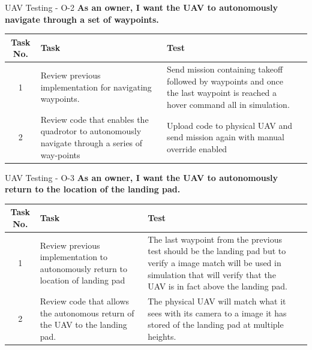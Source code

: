 \documentclass[11pt]{beamer}
\begin{document}
\begin{frame}{UAV Testing - O-2}
\textbf{As an owner, I want the UAV to autonomously navigate through a set of waypoints.}
\begin{tabular}{| c | >{\raggedright}m{4cm} | m{4cm} | c |}\hline
	Task No. & Task & Test\\\hline
	1 & Review previous implementation for navigating waypoints. & Send mission containing takeoff followed by waypoints and once the last waypoint is reached a hover command all in simulation.\\\hline
	2 & Review code that enables the quadrotor to autonomously navigate through a series of way-points & Upload code to physical UAV and send mission again with manual override enabled\\\hline
\end{tabular}
\end{frame}
\begin{frame}{UAV Testing - O-3}
\textbf{As an owner, I want the UAV to autonomously return to the location of the landing pad.}
\begin{tabular}{| c | >{\raggedright}m{4cm} | m{4cm} | c |}\hline
	Task No. & Task & Test\\\hline
	1 & Review previous implementation to autonomously return to location of landing pad & The last waypoint from the previous test should be the landing pad but to verify a image match will be used in simulation that will verify that the UAV is in fact above the landing pad.\\\hline
	2 & Review code that allows the autonomous return of the UAV to the landing pad. & The physical UAV will match what it sees with its camera to a image it has stored of the landing pad at multiple heights.\\\hline
\end{tabular}
\end{frame}
\end{document}
